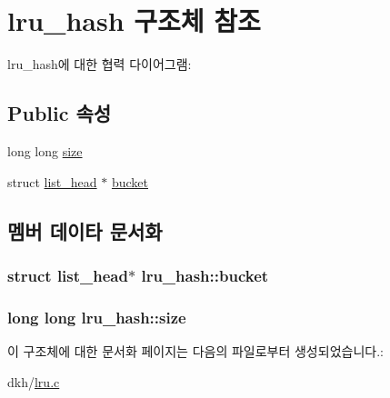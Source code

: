 \hypertarget{structlru__hash}{\section{lru\+\_\+hash 구조체 참조}
\label{structlru__hash}
}


lru\+\_\+hash에 대한 협력 다이어그램\+:
\subsection*{Public 속성}
\begin{DoxyCompactItemize}
\item 
long long \hyperlink{structlru__hash_a1b9ce5c0ddef7f9fd617fa5f0912806c}{size}
\item 
struct \hyperlink{structlist__head}{list\+\_\+head} $\ast$ \hyperlink{structlru__hash_a42472f64761ec3284c9b0611999deadc}{bucket}
\end{DoxyCompactItemize}


\subsection{멤버 데이타 문서화}
\hypertarget{structlru__hash_a42472f64761ec3284c9b0611999deadc}{
\subsubsection[{bucket}]{\setlength{\rightskip}{0pt plus 5cm}struct {\bf list\+\_\+head}$\ast$ lru\+\_\+hash\+::bucket}}\label{structlru__hash_a42472f64761ec3284c9b0611999deadc}
\hypertarget{structlru__hash_a1b9ce5c0ddef7f9fd617fa5f0912806c}{
\subsubsection[{size}]{\setlength{\rightskip}{0pt plus 5cm}long long lru\+\_\+hash\+::size}}\label{structlru__hash_a1b9ce5c0ddef7f9fd617fa5f0912806c}


이 구조체에 대한 문서화 페이지는 다음의 파일로부터 생성되었습니다.\+:\begin{DoxyCompactItemize}
\item 
dkh/\hyperlink{lru_8c}{lru.\+c}\end{DoxyCompactItemize}
